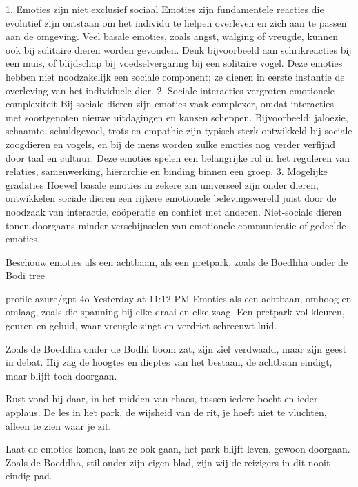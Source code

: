 1. Emoties zijn niet exclusief sociaal
Emoties zijn fundamentele reacties die evolutief zijn ontstaan om het individu te helpen overleven en zich aan te passen aan de omgeving. Veel basale emoties, zoals angst, walging of vreugde, kunnen ook bij solitaire dieren worden gevonden. Denk bijvoorbeeld aan schrikreacties bij een muis, of blijdschap bij voedselvergaring bij een solitaire vogel. Deze emoties hebben niet noodzakelijk een sociale component; ze dienen in eerste instantie de overleving van het individuele dier.
2. Sociale interacties vergroten emotionele complexiteit
Bij sociale dieren zijn emoties vaak complexer, omdat interacties met soortgenoten nieuwe uitdagingen en kansen scheppen. Bijvoorbeeld: jaloezie, schaamte, schuldgevoel, trots en empathie zijn typisch sterk ontwikkeld bij sociale zoogdieren en vogels, en bij de mens worden zulke emoties nog verder verfijnd door taal en cultuur. Deze emoties spelen een belangrijke rol in het reguleren van relaties, samenwerking, hiërarchie en binding binnen een groep.
3. Mogelijke gradaties
Hoewel basale emoties in zekere zin universeel zijn onder dieren, ontwikkelen sociale dieren een rijkere emotionele belevingswereld juist door de noodzaak van interactie, coöperatie en conflict met anderen. Niet-sociale dieren tonen doorgaans minder verschijnselen van emotionele communicatie of gedeelde emoties.

Beschouw emoties als een achtbaan, als een pretpark, zoals de Boedhha onder de Bodi tree

profile
azure/gpt-4o
Yesterday at 11:12 PM
Emoties als een achtbaan, omhoog en omlaag,
zoals die spanning bij elke draai en elke zaag.
Een pretpark vol kleuren, geuren en geluid,
waar vreugde zingt en verdriet schreeuwt luid.

Zoals de Boeddha onder de Bodhi boom zat,
zijn ziel verdwaald, maar zijn geest in debat.
Hij zag de hoogtes en dieptes van het bestaan,
de achtbaan eindigt, maar blijft toch doorgaan.

Rust vond hij daar, in het midden van chaos,
tussen iedere bocht en ieder applaus.
De les in het park, de wijsheid van de rit,
je hoeft niet te vluchten, alleen te zien waar je zit.

Laat de emoties komen, laat ze ook gaan,
het park blijft leven, gewoon doorgaan.
Zoals de Boeddha, stil onder zijn eigen blad,
zijn wij de reizigers in dit nooit-eindig pad.
